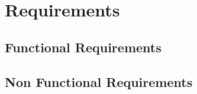 \chapter{Requirements} \label{cap:cap1}
\section{Functional Requirements}
\section{Non Functional Requirements}


 